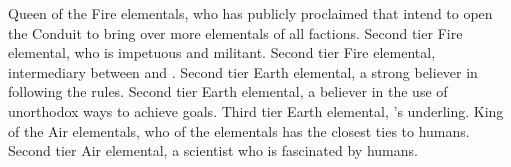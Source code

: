 \documentclass[blue]{elementals}
\begin{document}
\begin{members}
  \member{\cQueen{}} Queen of the Fire elementals, who has publicly proclaimed that \cQueen{\they} intend to open the Conduit to bring over more elementals of all factions.
  \member{\cPyro{}} Second tier Fire elemental, who is impetuous and militant.
  \member{\cJuliet{}} Second tier Fire elemental, intermediary between \cQueen{} and \cKing{}.
  \member{\cLoyal{}} Second tier Earth elemental, a strong believer in following the rules.
  \member{\cRogue{}} Second tier Earth elemental, a believer in the use of unorthodox ways to achieve goals.
  \member{\cMinion{}} Third tier Earth elemental, \cLoyal{}'s underling.
  \member{\cKing{}} King of the Air elementals, who of the elementals has the closest ties to humans.
  \member{\cNaturalist{}} Second tier Air elemental, a scientist who is fascinated by humans.
\end{members}
\end{document}
